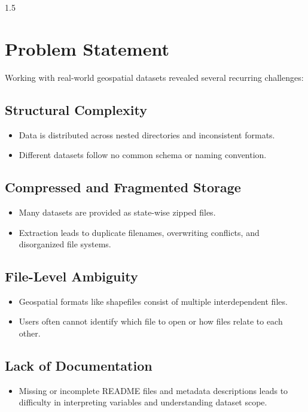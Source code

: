 \documentclass[12pt,a4paper]{report}
\begin{document}
\begin{spacing}{1.5}
\section{Problem Statement}
Working with real-world geospatial datasets revealed several recurring challenges:

\subsection{Structural Complexity}
\begin{itemize}
    \item Data is distributed across nested directories and inconsistent formats.
    \item Different datasets follow no common schema or naming convention.
\end{itemize}

\subsection{Compressed and Fragmented Storage}
\begin{itemize}
    \item Many datasets are provided as state-wise zipped files.
    \item Extraction leads to duplicate filenames, overwriting conflicts, and disorganized file systems.
\end{itemize}

\subsection{File-Level Ambiguity}
\begin{itemize}
    \item Geospatial formats like shapefiles consist of multiple interdependent files.
    \item Users often cannot identify which file to open or how files relate to each other.
\end{itemize}

\subsection{Lack of Documentation}
\begin{itemize}
    \item Missing or incomplete README files and metadata descriptions leads to difficulty in interpreting variables and understanding dataset scope.
\end{itemize}


\end{spacing}
\end{document}
